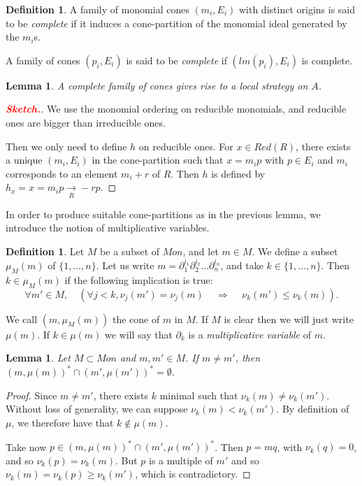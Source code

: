 \documentclass[10pt]{easychair}
\newtheorem{lemma}[theorem]{Lemma}
\theoremstyle{definition}
\newtheorem{definition}[theorem]{Definition}
\newcommand\rewR{\underset{R}{\longrightarrow}}
\newcommand\todo[1]{{\bf\textcolor{red}{#1.}}}
\begin{document}
 \begin{definition}
   A family of monomial cones $(m_i,E_i)$ with distinct origins is said to be \emph{complete} if it induces a cone-partition of the monomial ideal generated by the $m_i$s. 

   A family of cones $(p_i,E_i)$ is said to be \emph{complete} if $(lm(p_i),E_i)$ is complete. 
 \end{definition}

 \begin{lemma}
  A complete family of cones gives rise to a local strategy on $A$. 
\end{lemma}
\begin{proof}[\todo{Sketch}]
  We use the monomial ordering on reducible monomials, and reducible ones are bigger than irreducible ones.

  Then we only need to define $h$ on reducible ones. For $x \in Red(R)$, there exists a unique $(m_i,E_i)$ in the cone-partition such that $x=m_i p$ with $p \in E_i$ and $m_i$ corresponds to an element $m_i + r$ of $R$. Then $h$ is defined by $h_x = x = m_ip  \rewR -rp$.
\end{proof}


In order to produce suitable cone-partitions as in the previous lemma, we introduce the notion of multiplicative variables.

\begin{definition}
  Let $M$ be a subset of $Mon$, and let $m  \in M$. We define a subset $\mu_M(m)$ of $\{1,\ldots,n\}$. Let us write $m = \partial_1^{i_1}\partial_2^{i_2}\ldots \partial_n^{i_n}$, and take $k \in \{1,\ldots,n\}$. Then $k \in \mu_M(m)$ if the following implication is true:
  \[
\forall m' \in M, \quad (\forall j < k, \nu_j(m') = \nu_j(m) \, \quad \Rightarrow \quad \, \nu_k(m') \leq \nu_k(m)).
  \]
  

  We call $(m,\mu_M(m))$ the cone of $m$ in $M$. If $M$ is clear then we will just write $\mu(m)$. If $k \in \mu(m)$ we will say that $\partial_k$ is a \emph{multiplicative variable} of $m$.
\end{definition}

\begin{lemma}\label{lem:multiplicative_cones_disjoint}
Let $M \subset Mon$ and $m,m' \in M$. If $m \neq m'$, then $(m,\mu(m))^* \cap (m',\mu(m'))^* = \emptyset$.
\end{lemma}
\begin{proof}
   Since $m \neq m'$, there exists $k$ minimal such that $\nu_k(m) \neq \nu_k(m')$. Without loss of generality, we can suppose $\nu_k(m) < \nu_k(m')$. By definition of $\mu$, we therefore have that $k \notin \mu(m)$.

   Take now $p \in (m,\mu(m))^* \cap (m',\mu(m'))^*$. Then $p = mq$, with $\nu_k(q) = 0$, and so $\nu_k(p) = \nu_k(m)$. But $p$ is a multiple of $m'$ and so $\nu_k(m) = \nu_k(p) \geq \nu_k(m')$, which is contradictory.
 \end{proof}
\end{document}
